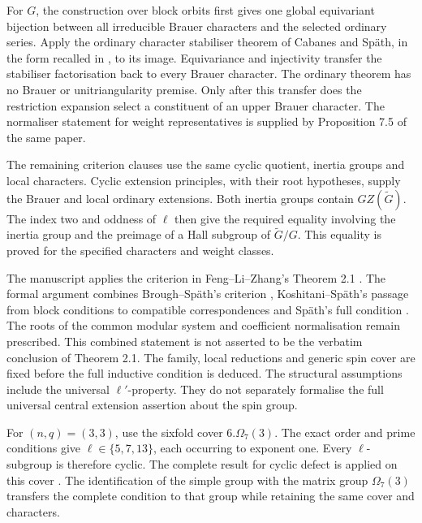For $G$, the construction over block orbits first gives one global
equivariant bijection between all irreducible Brauer characters
and the selected ordinary series. Apply the ordinary character
stabiliser theorem of Cabanes and Sp\"ath, in the form recalled in
\cite[Theorem~3.10]{FengLiZhang2022TypeB}, to its image.
Equivariance and injectivity transfer the stabiliser factorisation
back to every Brauer character. The ordinary theorem has no Brauer
or unitriangularity premise. Only after this transfer does the
restriction expansion select a constituent of an upper Brauer
character. The normaliser statement for weight representatives is
supplied by Proposition 7.5 of the same paper.

The remaining criterion clauses use the same cyclic quotient,
inertia groups and local characters. Cyclic extension principles,
with their root hypotheses, supply the Brauer and local ordinary
extensions. Both inertia groups contain $GZ(\widetilde G)$.
The index two and oddness of $\ell$ then give the required equality
involving the inertia group and the preimage of a Hall subgroup of
$\widetilde G/G$. This equality is proved for the specified
characters and weight classes.

The manuscript applies the criterion in Feng--Li--Zhang's
Theorem 2.1 \cite{FengLiZhang2022TypeB}. The formal argument combines
Brough--Sp\"ath's criterion \cite[Theorem~4.5]{BroughSpath2022},
Koshitani--Sp\"ath's passage from block conditions to compatible
correspondences \cite[Lemma~3.3]{KoshitaniSpath2016} and Sp\"ath's full
condition \cite[Definition~4.1]{Spath2013}. The roots of the common
modular system and coefficient normalisation remain prescribed.
This combined statement is not asserted to be the verbatim conclusion
of Theorem 2.1. The family, local reductions and generic spin cover
are fixed before the full inductive condition is deduced. The structural
assumptions include the universal $\ell'$-property. They do
not separately formalise the full universal central extension
assertion about the spin group.

For $(n,q)=(3,3)$, use the
sixfold cover $6.\Omega_7(3)$. The exact order and prime conditions
give $\ell\in\{5,7,13\}$, each occurring to exponent one.
Every $\ell$-subgroup is therefore cyclic. The complete
result for cyclic defect is applied on this cover
\cite[Theorem~1.1]{KoshitaniSpath2016}. The identification of the simple
group with the matrix group $\Omega_7(3)$ transfers the complete condition
to that group while retaining the same cover and characters.

